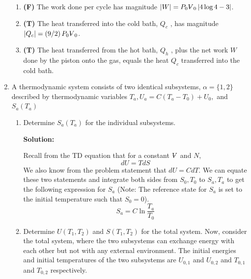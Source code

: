 \documentclass[10pt]{article}
\newenvironment{Solution}
    {\textbf{Solution:}
    
    \vspace{5mm}
    \begin{tcolorbox}
    }
    {
    \end{tcolorbox}
    \vspace{5mm}
    }
\newcommand{\vol}{{\ooalign{\hfil$V$\hfil\cr\kern0.08em--\hfil\cr}}}
\begin{document}
\begin{enumerate}
\begin{enumerate}
    
    \item \textbf{(F)} The work done per cycle has magnitude $\left|W\right| = P_0 \vol_0 \left|4 \log{4} - 3\right|$.
    
    
    \item \textbf{(T)} The heat transferred into the cold bath, $Q_c$ , has magnitude $\left|Q_c \right| = \left(9/2\right)P_0 \vol_0$.
    
    \item \textbf{(T)} The heat transferred from the hot bath, $Q_h$ , plus the net work $W$ done by the piston onto the gas, equals the heat $Q_c$ transferred into the cold bath.
    
    
\end{enumerate}

\newpage

\item A thermodynamic system consists of two identical subsystems, $\alpha=\{1,2\}$ described by thermodynamic variables $T_{a}, U_{a}=C\left(T_{a}-T_{0}\right)+U_{0},$ and $S_{a}\left(T_{a}\right)$

\begin{enumerate}

\item Determine $S_{a}\left(T_{a}\right)$ for the individual subsystems.

\begin{Solution}
Recall from the TD equation that for a constant $\vol$ and $N$,
\begin{equation}\label{dutds}
    dU = T dS
\end{equation}
We also know from the problem statement that $dU = CdT$. We can equate these two statements and integrate both sides from $S_0, T_0$ to $S_a, T_a$ to get the following expression for $S_a$ (Note: The reference state for $S_a$ is set to the initial temperature such that $S_0 = 0$).
\begin{equation}
\boxed{
    S_a = C \ln{\frac{T_a}{T_0}}
    }
\end{equation}

\end{Solution}

\item Determine $U\left(T_{1}, T_{2}\right)$ and $S\left(T_{1}, T_{2}\right)$ for the total system.
Now, consider the total system, where the two subsystems can exchange energy with each other but not with any external environment. The initial energies and initial temperatures of the two subsystems are $U_{0, 1}$ and $U_{0, 2}$ and $T_{0, 1}$ and $T_{0, 2}$ respectively.


\end{enumerate}
\end{enumerate}
\end{document}
